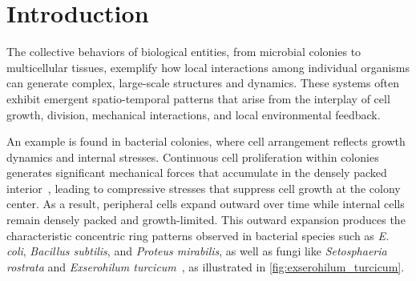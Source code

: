 \documentclass[a4paper,fleqn]{cas-dc}
\begin{document}
\maketitle





\section{Introduction}

The collective behaviors of biological entities, from microbial colonies to multicellular tissues, exemplify how local interactions among individual organisms can generate complex, large-scale structures and dynamics. These systems often exhibit emergent spatio-temporal patterns that arise from the interplay of cell growth, division, mechanical interactions, and local environmental feedback.

An example is found in bacterial colonies, where cell arrangement reflects growth dynamics and internal stresses. Continuous cell proliferation within colonies generates significant mechanical forces that accumulate in the densely packed interior~\cite{Wittmann2023}, leading to compressive stresses that suppress cell growth at the colony center. As a result, peripheral cells expand outward over time while internal cells remain densely packed and growth-limited. This outward expansion produces the characteristic concentric ring patterns observed in bacterial species such as \textit{E. coli}, \textit{Bacillus subtilis}, and \textit{Proteus mirabilis}, as well as fungi like \textit{Setosphaeria rostrata} and \textit{Exserohilum turcicum}~\cite{YAMAZAKI2005136}, as illustrated in \autoref{fig:exserohilum_turcicum}.
\end{document}
